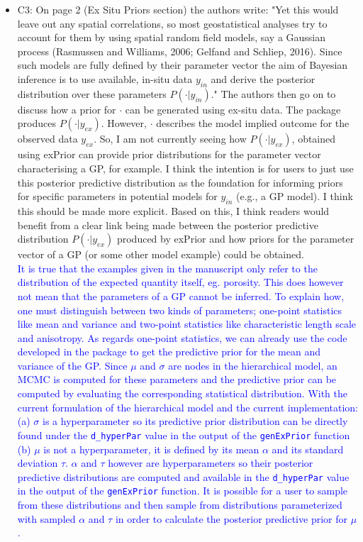 \documentclass{article}
\begin{document}
\begin{itemize}
    \item C3: On page 2 (Ex Situ Priors section) the authors write: "Yet this would leave out any spatial correlations, so most geostatistical analyses try to account for them by using spatial random field models, say a Gaussian process (Rasmussen and Williams, 2006; Gelfand and Schliep, 2016). Since such models are fully defined by their parameter vector the aim of Bayesian inference is to use available, in-situ data $y_{in}$ and derive the posterior distribution over these parameters $P(\cdot|y_{in})$." The authors then go on to discuss how a prior for $\cdot$ can be generated using ex-situ data. The package produces $P(\cdot|y_{ex})$. However, $\cdot$ describes the model implied outcome for the observed data $y_{ex}$. So, I am not currently seeing how $P(\cdot|y_{ex})$, obtained using exPrior can provide prior distributions for the parameter vector characterising a GP, for example. I think the intention is for users to just use this posterior predictive distribution as the foundation for informing priors for specific parameters in potential models for $y_{in}$ (e.g., a GP model). I think this should be made more explicit. Based on this, I think readers would benefit from a clear link being made between the posterior predictive distribution $P(\cdot|y_{ex})$ produced by exPrior and how priors for the parameter vector of a GP (or some other model example) could be obtained.\\
    \textcolor{blue}{It is true that the examples given in the manuscript only refer to the distribution of the expected quantity itself, eg. porosity. This does however not mean that the parameters of a GP cannot be inferred.} \textcolor{blue}{To explain how, one must distinguish between two kinds of parameters; one-point statistics like mean and variance and two-point statistics like characteristic length scale and anisotropy.}
    \textcolor{blue}{As regards one-point statistics, we can already use the code developed in the package to get the predictive prior for the mean and variance of the GP. Since $\mu$ and $\sigma$ are nodes in the hierarchical model, an MCMC is computed for these parameters and the predictive prior can be computed by evaluating the corresponding statistical distribution. With the current formulation of the hierarchical model and the current implementation: (a) $\sigma$ is a hyperparameter so its predictive prior distribution can be directly found under the \texttt{d\_hyperPar} value in the output of the \texttt{genExPrior} function (b) $\mu$ is not a hyperparameter, it is defined by its mean $\alpha$ and its standard deviation $\tau$. $\alpha$ and $\tau$ however are hyperparameters so their posterior predictive distributions are computed and available in the \texttt{d\_hyperPar} value in the output of the \texttt{genExPrior} function. It is possible for a user to sample from these distributions and then sample from distributions parameterized with sampled $\alpha$ and $\tau$ in order to calculate the posterior predictive prior for $\mu$.}

\end{itemize}
\end{document}
